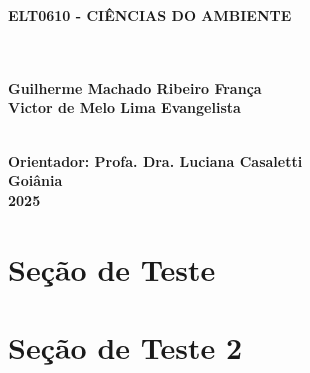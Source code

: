 \documentclass[a4paper, 12pt]{article}
\begin{document}
\begin{center}
    \textbf{ELT0610 - CIÊNCIAS DO AMBIENTE}\\
    \vspace{3cm}

    \textbf{}\\
    \textbf{}\\
    \textbf{Guilherme Machado Ribeiro França}\\
    \textbf{Victor de Melo Lima Evangelista}\\
    \textbf{}\\
    \vspace{3cm}

    \textbf{Orientador: Profa. Dra. Luciana Casaletti}\\
    \vspace*{2cm}
    \textbf{Goiânia}\\
    \textbf{2025\\}

    \section{Seção de Teste}

    \section{Seção de Teste 2}


\end{center}
\end{document}

